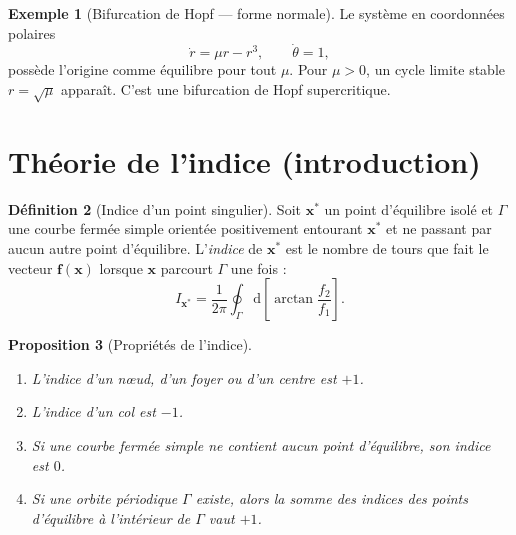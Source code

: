 \documentclass[12pt,a4paper,openany]{book}
\theoremstyle{definition}
\newtheorem{definition}{Définition}[chapter]
\newtheorem{exemple}[definition]{Exemple}
\theoremstyle{plain}
\newtheorem{proposition}[definition]{Proposition}
\theoremstyle{remark}
\newcommand{\dd}{\mathrm{d}}
\begin{document}
\begin{exemple}[Bifurcation de Hopf --- forme normale]
\label{ex:hopf-normale}
Le système en coordonnées polaires
\[
\dot{r} = \mu r - r^3, \qquad \dot{\theta} = 1,
\]
possède l'origine comme équilibre pour tout $\mu$. Pour $\mu > 0$,
un cycle limite stable $r = \sqrt{\mu}$ apparaît. C'est une bifurcation
de Hopf supercritique.
\end{exemple}

\begin{center}
\end{center}

\section{Théorie de l'indice (introduction)}
\label{sec:indice}

\begin{definition}[Indice d'un point singulier]
\label{def:indice}
Soit $\mathbf{x}^*$ un point d'équilibre isolé et $\Gamma$ une
courbe fermée simple orientée positivement entourant $\mathbf{x}^*$
et ne passant par aucun autre point d'équilibre. L'\emph{indice} de
$\mathbf{x}^*$ est le nombre de tours que fait le vecteur
$\mathbf{f}(\mathbf{x})$ lorsque $\mathbf{x}$ parcourt $\Gamma$
une fois :
\[
I_{\mathbf{x}^*} = \frac{1}{2\pi}
\oint_\Gamma \dd\left[\arctan\frac{f_2}{f_1}\right].
\]
\end{definition}

\begin{proposition}[Propriétés de l'indice]
\label{prop:indice-prop}
\begin{enumerate}[label=(\roman*)]
  \item L'indice d'un n\oe ud, d'un foyer ou d'un centre est $+1$.
  \item L'indice d'un col est $-1$.
  \item Si une courbe fermée simple ne contient aucun point
        d'équilibre, son indice est $0$.
  \item Si une orbite périodique $\Gamma$ existe, alors la somme des
        indices des points d'équilibre à l'intérieur de $\Gamma$
        vaut $+1$.
\end{enumerate}
\end{proposition}
\end{document}
